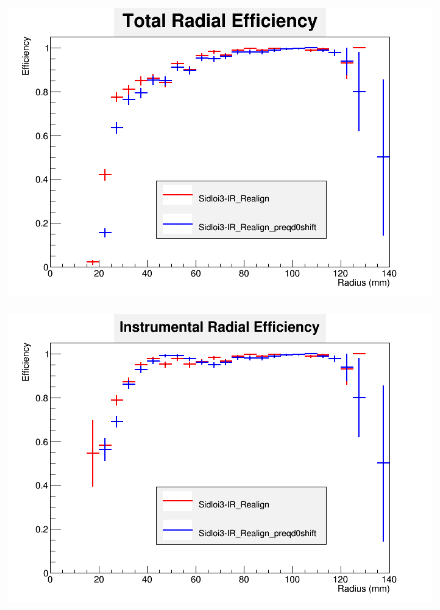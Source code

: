 \documentclass{report}
\begin{document}
                \begin{figure}[H] 
                    \includegraphics[width=\textwidth]{RadialEfficiencyFP_total}
                    \centering
                    \caption{}
                    \label{fig__lstar_beamcal_total}
                \end{figure}
                \begin{figure}[H]
                    \includegraphics[width=\textwidth]{RadialEfficiencyFP_instrumental}
                    \centering
                    \caption{}
                    \label{fig__lstar_beamcal_inst}
                \end{figure}
\end{document}
